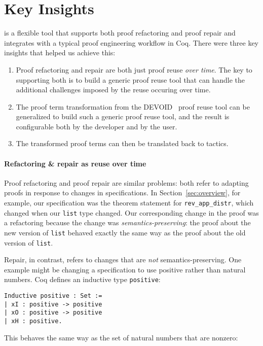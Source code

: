\section{Key Insights}
\label{sec:key}

\toolname is a flexible tool that supports both proof refactoring and proof repair and integrates
with a typical proof engineering workflow in Coq.
There were three key insights that helped us achieve this:

\begin{enumerate}
\item Proof refactoring and repair are both just 
proof reuse %
\textit{over time}. The key to supporting both is to build a generic proof reuse
tool that can handle the additional challenges imposed by the reuse occuring over time. 
\item The proof term transformation from the \textsc{DEVOID}~\cite{Ringer2019} proof reuse tool can be generalized
to build such a generic proof reuse tool, and the result is configurable both by the developer and by the user.
\item The transformed proof terms can then be translated back to tactics.
\end{enumerate}

\paragraph{Refactoring \& repair as reuse over time}

Proof refactoring and proof repair are similar problems: both refer to adapting proofs in response to changes
in specifications. In Section~\ref{sec:overview}, for example, our specification was the theorem statement
for \lstinline{rev_app_distr}, which changed when our \lstinline{list} type changed.
Our corresponding change in the proof was a refactoring because the change was \textit{semantics-preserving}:
the proof about the new version of \lstinline{list} behaved exactly the same way as the proof about the old
version of \lstinline{list}.

Repair, in contrast, refers to changes that are \textit{not} semantics-preserving.
One example might be changing a specification to use positive rather than natural numbers.
Coq defines an inductive type \lstinline{positive}:

\begin{lstlisting}
Inductive positive : Set :=
| xI : positive -> positive
| xO : positive -> positive
| xH : positive.
\end{lstlisting}
This behaves the same way as the set of natural numbers that are nonzero:

